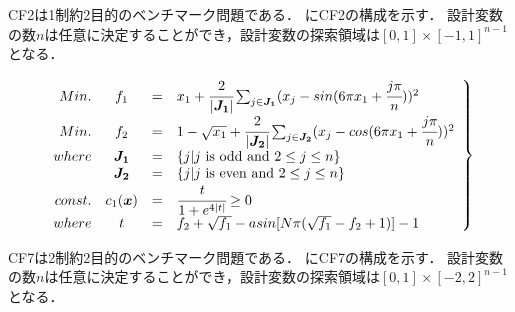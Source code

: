 \documentclass[../main/main]{subfiles}
\begin{document}
CF2は1制約2目的のベンチマーク問題である．
にCF2の構成を示す．
設計変数の数$n$は任意に決定することができ，設計変数の探索領域は$[0,1] \times [-1,1]^{n-1}$となる．

\begin{eqnarray} 
\left.
\begin{array}{rccl}
Min. & f_1 &=& x_1 + \cfrac{2}{|\bm{J_1}|} \sum_{j \in \bm{J_1}}(x_j - sin(6\pi x_1 + \cfrac{j\pi}{n}))^2\\
Min. &f_2 &=& 1 - \sqrt{x_1} + \cfrac{2}{|\bm{J_2}|} \sum_{j \in \bm{J_2}} (x_j - cos(6\pi x_1 + \cfrac{j\pi}{n}))^2\\

where &  \bm{J_1} &=& \{j|j {\rm \ is \ odd \ and \ } 2 \leq j \leq n\}\\
& \bm{J_2} &=& \{j|j {\rm \ is \ even \ and \ } 2 \leq j \leq n\}\\
const. & c_1(\bm x) & = &\cfrac{t}{1 + e^{4|t|}} \geq 0\\
where & t &=& f_2 + \sqrt{f_1} - a sin[N\pi (\sqrt{f_1} - f_2 + 1)] - 1\\
   \label{cf2_eq} 
\end{array}
\right\}
\end{eqnarray}


CF7は2制約2目的のベンチマーク問題である．
にCF7の構成を示す．
設計変数の数$n$は任意に決定することができ，設計変数の探索領域は$[0,1] \times [-2,2]^{n-1}$となる．
\end{document}
